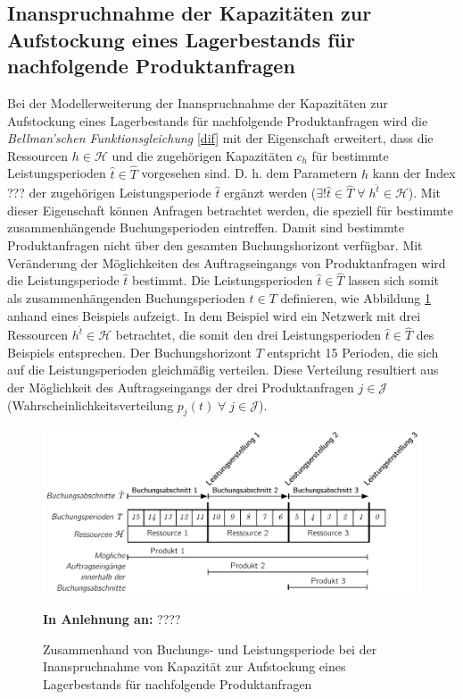 \subsection{Inanspruchnahme der Kapazitäten zur Aufstockung eines Lagerbestands für nachfolgende Produktanfragen}

Bei der Modellerweiterung der Inanspruchnahme der Kapazitäten zur Aufstockung eines Lagerbestands für nachfolgende Produktanfragen wird die \textit{Bellman'schen Funktionsgleichung} \ref{dif} mit der Eigenschaft erweitert, dass die Ressourcen $h\in\mathcal{H}$ und die zugehörigen Kapazitäten $c_{h}$ für bestimmte Leistungsperioden $\hat{t}\in \hat{T}$ vorgesehen sind. D. h. dem Parametern $h$ kann der Index ??? der zugehörigen Leistungsperiode $\hat{t}$ ergänzt werden ($\exists{!\hat{t}}\in\hat{T}\; \forall\; h^{\hat{t}}\in\mathcal{H}$). Mit dieser Eigenschaft können Anfragen betrachtet werden, die speziell für bestimmte zusammenhängende Buchungsperioden eintreffen. Damit sind bestimmte Produktanfragen nicht über den gesamten Buchungshorizont verfügbar. Mit Veränderung der Möglichkeiten des Auftragseingangs von Produktanfragen wird die Leistungsperiode $\hat{t}$ bestimmt. Die Leistungsperioden $\hat{t}\in \hat{T}$ lassen sich somit als zusammenhängenden Buchungsperioden $t\in T$ definieren, wie Abbildung \ref{LP} anhand eines Beispiels aufzeigt. In dem Beispiel wird ein Netzwerk mit drei Ressourcen $h^{\hat{t}}\in\mathcal{H}$ betrachtet, die somit den drei Leistungsperioden $\hat{t}\in\hat{T}$ des Beispiels entsprechen. Der Buchungshorizont $T$ entspricht 15 Perioden, die sich auf die Leistungsperioden gleichmäßig verteilen. Diese Verteilung resultiert aus der Möglichkeit des Auftragseingangs der drei Produktanfragen $j\in\mathcal{J}$ (Wahrscheinlichkeitsverteilung $p_j(t)\; \forall\; j\in\mathcal{J}$).

\begin{figure}[h!]
  \begin{center}
    \includegraphics[width=130mm]{Bilder/Leistungsperioden.pdf}
    \caption{Zusammenhand von Buchungs- und Leistungsperiode bei der Inanspruchnahme von Kapazität zur Aufstockung eines Lagerbestands für nachfolgende Produktanfragen}  \label{LP}
    {\footnotesize \textbf{In Anlehnung an:} ????} 
  \end{center}
\end{figure}

